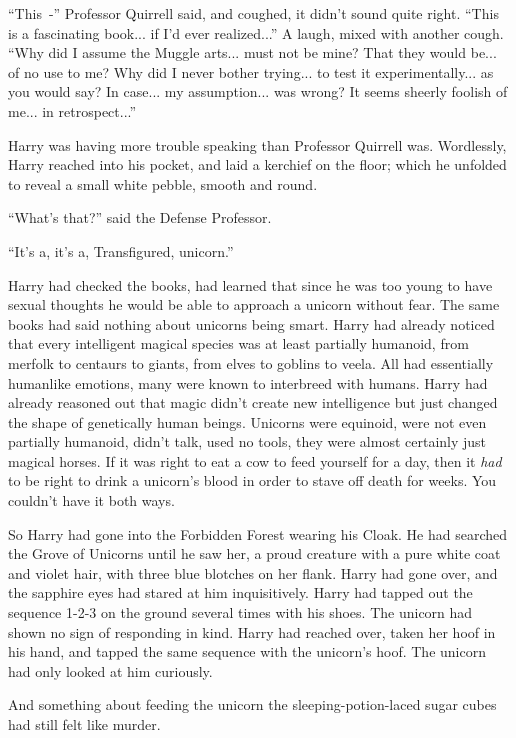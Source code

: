 ``This~-'' Professor Quirrell said, and coughed, it didn't sound quite right. ``This is a fascinating book... if I'd ever realized...'' A laugh, mixed with another cough. ``Why did I assume the Muggle arts... must not be mine? That they would be... of no use to me? Why did I never bother trying... to test it experimentally... as you would say? In case... my assumption... was wrong? It seems sheerly foolish of me... in retrospect...''

Harry was having more trouble speaking than Professor Quirrell was. Wordlessly, Harry reached into his pocket, and laid a kerchief on the floor; which he unfolded to reveal a small white pebble, smooth and round.

``What's that?'' said the Defense Professor.

``It's a, it's a, Transfigured, unicorn.''

Harry had checked the books, had learned that since he was too young to have sexual thoughts he would be able to approach a unicorn without fear. The same books had said nothing about unicorns being smart. Harry had already noticed that every intelligent magical species was at least partially humanoid, from merfolk to centaurs to giants, from elves to goblins to veela. All had essentially humanlike emotions, many were known to interbreed with humans. Harry had already reasoned out that magic didn't create new intelligence but just changed the shape of genetically human beings. Unicorns were equinoid, were not even partially humanoid, didn't talk, used no tools, they were almost certainly just magical horses. If it was right to eat a cow to feed yourself for a day, then it \emph{had} to be right to drink a unicorn's blood in order to stave off death for weeks. You couldn't have it both ways.

So Harry had gone into the Forbidden Forest wearing his Cloak. He had searched the Grove of Unicorns until he saw her, a proud creature with a pure white coat and violet hair, with three blue blotches on her flank. Harry had gone over, and the sapphire eyes had stared at him inquisitively. Harry had tapped out the sequence 1-2-3 on the ground several times with his shoes. The unicorn had shown no sign of responding in kind. Harry had reached over, taken her hoof in his hand, and tapped the same sequence with the unicorn's hoof. The unicorn had only looked at him curiously.

And something about feeding the unicorn the sleeping-potion-laced sugar cubes had still felt like murder.


